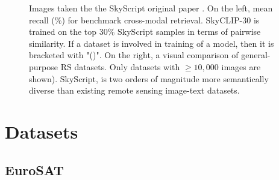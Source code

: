 \documentclass[a4paper, oneside, english]{sapthesis} %
\begin{document}
\begin{figure}[h]
    \centering
     \quad
\caption{Images taken the the SkyScript original paper \cite{wang2024skyscript}. On the left, mean recall (\%) for benchmark cross-modal retrieval. SkyCLIP-30 is trained on the top $30\%$ SkyScript samples in terms of pairwise similarity. If a dataset is involved in training of a model, then it is bracketed with "()". On the right, a visual comparison of general-purpose RS datasets. Only datasets with $\ge 10,000$ images are shown). SkyScript, is two orders of magnitude more semantically diverse than existing remote sensing image-text datasets.}
\label{fig:skyclip}
\end{figure}


\chapter{Datasets} %

\section{EuroSAT}\label{EuroSAT}
\end{document}

